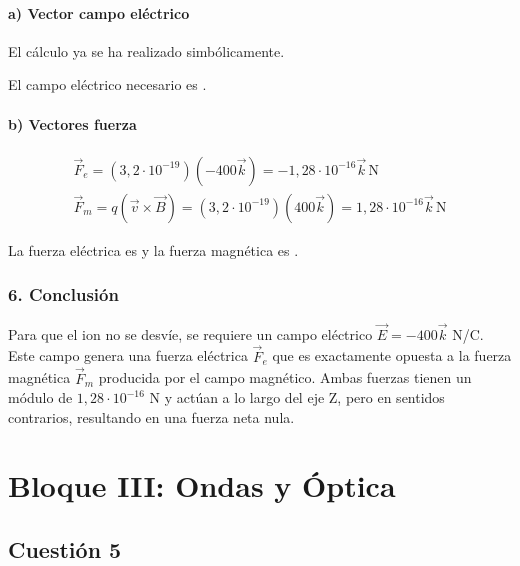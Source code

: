\paragraph*{a) Vector campo eléctrico}
El cálculo ya se ha realizado simbólicamente.
\begin{cajaresultado}
    El campo eléctrico necesario es .
\end{cajaresultado}
\paragraph*{b) Vectores fuerza}
\begin{gather}
    \vec{F}_e = (3,2\cdot10^{-19})(-400\vec{k}) = -1,28\cdot10^{-16}\vec{k} \, \text{N} \\
    \vec{F}_m = q(\vec{v} \times \vec{B}) = (3,2\cdot10^{-19})(400\vec{k}) = 1,28\cdot10^{-16}\vec{k} \, \text{N}
\end{gather}
\begin{cajaresultado}
    La fuerza eléctrica es  y la fuerza magnética es .
\end{cajaresultado}

\subsubsection*{6. Conclusión}
\begin{cajaconclusion}
Para que el ion no se desvíe, se requiere un campo eléctrico $\vec{E} = -400\vec{k}$ N/C. Este campo genera una fuerza eléctrica $\vec{F}_e$ que es exactamente opuesta a la fuerza magnética $\vec{F}_m$ producida por el campo magnético. Ambas fuerzas tienen un módulo de $1,28\cdot10^{-16}$ N y actúan a lo largo del eje Z, pero en sentidos contrarios, resultando en una fuerza neta nula.
\end{cajaconclusion}
\newpage
\section{Bloque III: Ondas y Óptica}
\label{sec:ondas_2020_jul_ext}

\subsection{Cuestión 5}
\label{subsec:C5_2020_jul_ext_b}

